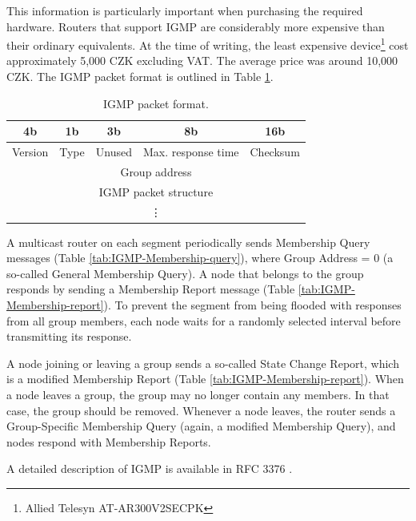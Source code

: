 This information is particularly important when purchasing the required hardware. Routers that support IGMP are considerably more expensive than their ordinary equivalents. At the time of writing, the least expensive device\footnote{Allied Telesyn AT-AR300V2SECPK} cost approximately 5,000 CZK excluding VAT. The average price was around 10,000 CZK. The IGMP packet format is outlined in Table \ref{tab:IGMP-packet-format}.

\begin{table}[htp]
\centering
\begin{tabular}[t]{|c|c|c|c|c|}
4b & 1b & 3b & 8b & 16b \\
\hline	Version & Type & Unused & Max. response time & Checksum\\
\hline	\multicolumn{5}{|c|}{Group address} \\
\hline	\multicolumn{5}{|c|}{IGMP packet structure} \\
		\multicolumn{5}{|c|}{\vdots} \\
\hline
\end{tabular}
\caption{IGMP packet format.}
\label{tab:IGMP-packet-format}
\end{table}

A multicast router on each segment periodically sends Membership Query messages (Table \ref{tab:IGMP-Membership-query}), where Group Address = 0 (a so-called General Membership Query). A node that belongs to the group responds by sending a Membership Report message (Table \ref{tab:IGMP-Membership-report}). To prevent the segment from being flooded with responses from all group members, each node waits for a randomly selected interval before transmitting its response.

A node joining or leaving a group sends a so-called State Change Report, which is a modified Membership Report (Table \ref{tab:IGMP-Membership-report}). When a node leaves a group, the group may no longer contain any members. In that case, the group should be removed. Whenever a node leaves, the router sends a Group-Specific Membership Query (again, a modified Membership Query), and nodes respond with Membership Reports.

A detailed description of IGMP is available in RFC 3376 \cite{RFC-3376-IGMP-Protocol}.

